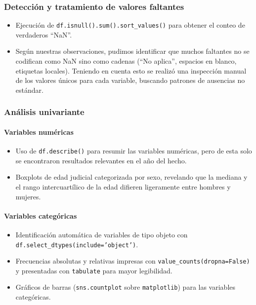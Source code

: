 \documentclass[lettersize,journal]{IEEEtran}
\begin{document}
\subsubsection{Detección y tratamiento de valores faltantes}
\begin{itemize}
    \item Ejecución de \texttt{df.isnull().sum().sort\_values()} para obtener el conteo de verdaderos “NaN”.
    \item Según nuestras observaciones, pudimos identificar que muchos faltantes no se codifican como NaN sino como cadenas (“No aplica”, espacios en blanco, etiquetas locales). Teniendo en cuenta esto se realizó una inspección manual de los valores únicos para cada variable, buscando patrones de ausencias no estándar.
\end{itemize}

\subsubsection{Análisis univariante}

\paragraph{Variables numéricas}
\begin{itemize}
    \item Uso de \texttt{df.describe()} para resumir las variables numéricas, pero de esta solo se encontraron resultados relevantes en el año del hecho.
    \item Boxplots de edad judicial categorizada por sexo, revelando que la mediana y el rango intercuartílico de la edad difieren ligeramente entre hombres y mujeres.
\end{itemize}

\paragraph{Variables categóricas}
\begin{itemize}
    \item Identificación automática de variables de tipo objeto con \texttt{df.select\_dtypes(include='object')}.
    \item Frecuencias absolutas y relativas impresas con \texttt{value\_counts(dropna=False)} y presentadas con \texttt{tabulate} para mayor legibilidad.
    \item Gráficos de barras (\texttt{sns.countplot} sobre \texttt{matplotlib}) para las variables categóricas.
\end{itemize}
\end{document}
